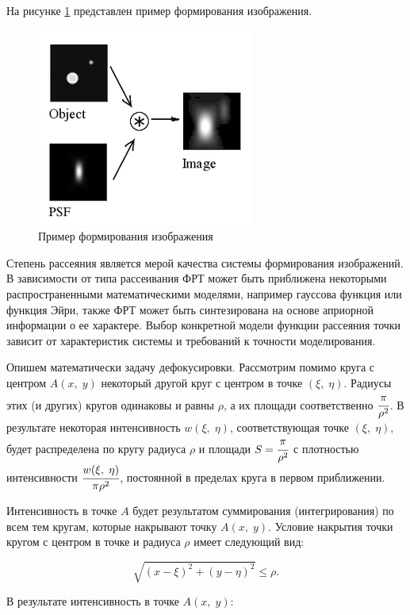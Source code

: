 На рисунке \ref{psf_img} представлен пример формирования изображения.

\begin{figure}[H]
	\centering
	\includegraphics[scale=0.9]{assets/psf.png}
	\caption{Пример формирования изображения}
	\label{psf_img}
\end{figure}

Степень рассеяния является мерой качества системы формирования изображений. В зависимости от типа рассеивания ФРТ может быть приближена некоторыми распространенными математическими моделями, например гауссова функция или функция Эйри, также ФРТ может быть синтезирована на основе априорной информации о ее характере. Выбор конкретной модели функции рассеяния точки зависит от характеристик системы и требований к точности моделирования.

Опишем математически задачу дефокусировки. Рассмотрим помимо круга с центром $A(x,\;y)$ некоторый другой круг с центром в точке $(\xi,\;\eta)$. Радиусы этих (и других) кругов одинаковы и равны $\rho$, а их площади соответственно $\cfrac{\pi}{\rho^2}$. В результате некоторая интенсивность $w(\xi,\;\eta)$, соответствующая точке $(\xi,\;\eta)$, будет распределена по кругу радиуса $\rho$ и площади $S = \cfrac{\pi}{\rho^2}$ с плотностью интенсивности $\cfrac{w(\xi,\;\eta)}{\pi\rho^2}$, постоянной в пределах круга в первом приближении. 

Интенсивность в точке $A$ будет результатом суммирования (интегрирования) по всем тем кругам, которые накрывают точку $A(x,\;y)$. Условие накрытия точки кругом с центром в точке и радиуса $\rho$ имеет следующий вид:

\begin{equation}
	\sqrt{(x - \xi) ^ 2 + (y - \eta)^2} \leq \rho.
\end{equation}

В результате интенсивность в точке $A(x,\;y)$:

